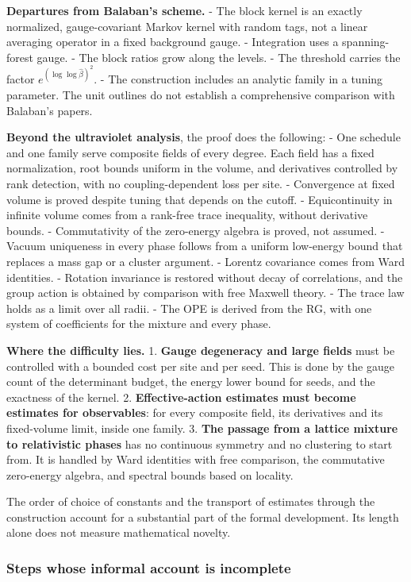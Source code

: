 \documentclass[
  letterpaper,
  11pt]{article}
\begin{document}
\textbf{Departures from Balaban's scheme.} - The block kernel is an
exactly normalized, gauge-covariant Markov kernel with random tags, not
a linear averaging operator in a fixed background gauge. - Integration
uses a spanning-forest gauge. - The block ratios grow along the levels.
- The threshold carries the factor \(e^{(\log\log\hat\beta)^2}\). - The
construction includes an analytic family in a tuning parameter. The unit
outlines do not establish a comprehensive comparison with Balaban's
papers.

\textbf{Beyond the ultraviolet analysis}, the proof does the following:
- One schedule and one family serve composite fields of every degree.
Each field has a fixed normalization, root bounds uniform in the volume,
and derivatives controlled by rank detection, with no coupling-dependent
loss per site. - Convergence at fixed volume is proved despite tuning
that depends on the cutoff. - Equicontinuity in infinite volume comes
from a rank-free trace inequality, without derivative bounds. -
Commutativity of the zero-energy algebra is proved, not assumed. -
Vacuum uniqueness in every phase follows from a uniform low-energy bound
that replaces a mass gap or a cluster argument. - Lorentz covariance
comes from Ward identities. - Rotation invariance is restored without
decay of correlations, and the group action is obtained by comparison
with free Maxwell theory. - The trace law holds as a limit over all
radii. - The OPE is derived from the RG, with one system of coefficients
for the mixture and every phase.

\textbf{Where the difficulty lies.} 1. \textbf{Gauge degeneracy and
large fields} must be controlled with a bounded cost per site and per
seed. This is done by the gauge count of the determinant budget, the
energy lower bound for seeds, and the exactness of the kernel. 2.
\textbf{Effective-action estimates must become estimates for
observables}: for every composite field, its derivatives and its
fixed-volume limit, inside one family. 3. \textbf{The passage from a
lattice mixture to relativistic phases} has no continuous symmetry and
no clustering to start from. It is handled by Ward identities with free
comparison, the commutative zero-energy algebra, and spectral bounds
based on locality.

The order of choice of constants and the transport of estimates through
the construction account for a substantial part of the formal
development. Its length alone does not measure mathematical novelty.

\subsubsection{Steps whose informal account is
incomplete}\label{steps-whose-informal-account-is-incomplete}
\end{document}
